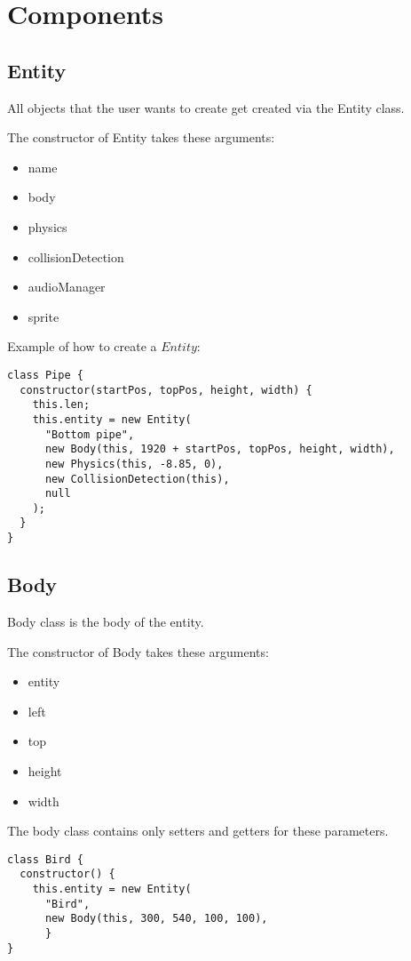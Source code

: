 \chapter{Components}
\section{Entity}

All objects that the user wants to create get created via the Entity class.



The constructor of Entity takes these arguments:

\begin{itemize}
	\item name
    \item body
    \item physics
    \item collisionDetection
    \item audioManager
    \item sprite
\end{itemize}


Example of how to create a $Entity$:

\begin{lstlisting}
class Pipe {
  constructor(startPos, topPos, height, width) {
    this.len;
    this.entity = new Entity(
      "Bottom pipe",
      new Body(this, 1920 + startPos, topPos, height, width),
      new Physics(this, -8.85, 0),
      new CollisionDetection(this),
      null
    );
  }
}
\end{lstlisting}


\section{Body}
Body class is the body of the entity.  

The constructor of Body takes these arguments:

\begin{itemize}
	\item entity
    \item left
    \item top
    \item height
    \item width
\end{itemize}

The body class contains only setters and getters for these parameters.

\begin{lstlisting}
class Bird {
  constructor() {
    this.entity = new Entity(
      "Bird",
      new Body(this, 300, 540, 100, 100),
      }
}
\end{lstlisting}

